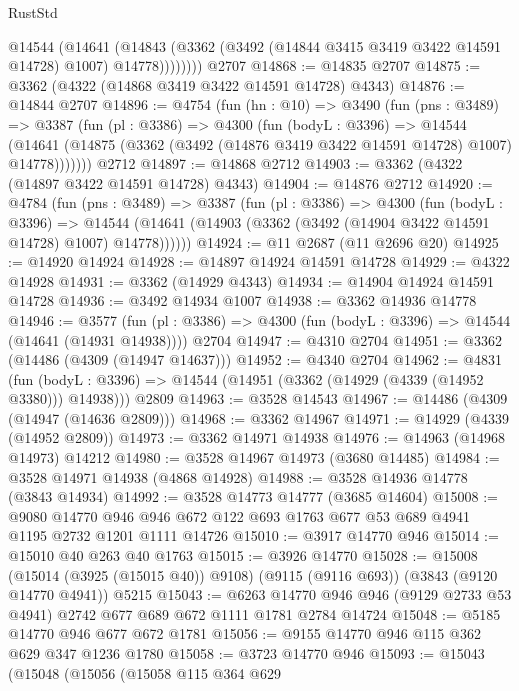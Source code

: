\begin{lexlean}{RustStd}
\begin{coremodule}
            @14544
              (@14641
                (@14843 (@3362 (@3492 (@14844 @3415 @3419 @3422 @14591 @14728) @1007) @14778))))))))
    @2707
@14868 := @14835 @2707
@14875 := @3362 (@4322 (@14868 @3419 @3422 @14591 @14728) @4343)
@14876 := @14844 @2707
@14896 := @4754
    (fun (hn : @10) =>
    @3490
      (fun (pns : @3489) =>
      @3387
        (fun (pl : @3386) =>
        @4300
          (fun (bodyL : @3396) =>
          @14544
            (@14641 (@14875 (@3362 (@3492 (@14876 @3419 @3422 @14591 @14728) @1007) @14778)))))))
    @2712
@14897 := @14868 @2712
@14903 := @3362 (@4322 (@14897 @3422 @14591 @14728) @4343)
@14904 := @14876 @2712
@14920 := @4784
    (fun (pns : @3489) =>
    @3387
      (fun (pl : @3386) =>
      @4300
        (fun (bodyL : @3396) =>
        @14544 (@14641 (@14903 (@3362 (@3492 (@14904 @3422 @14591 @14728) @1007) @14778))))))
@14924 := @11 @2687 (@11 @2696 @20)
@14925 := @14920 @14924
@14928 := @14897 @14924 @14591 @14728
@14929 := @4322 @14928
@14931 := @3362 (@14929 @4343)
@14934 := @14904 @14924 @14591 @14728
@14936 := @3492 @14934 @1007
@14938 := @3362 @14936 @14778
@14946 := @3577
    (fun (pl : @3386) => @4300 (fun (bodyL : @3396) => @14544 (@14641 (@14931 @14938))))
    @2704
@14947 := @4310 @2704
@14951 := @3362 (@14486 (@4309 (@14947 @14637)))
@14952 := @4340 @2704
@14962 := @4831
    (fun (bodyL : @3396) => @14544 (@14951 (@3362 (@14929 (@4339 (@14952 @3380))) @14938)))
    @2809
@14963 := @3528 @14543
@14967 := @14486 (@4309 (@14947 (@14636 @2809)))
@14968 := @3362 @14967
@14971 := @14929 (@4339 (@14952 @2809))
@14973 := @3362 @14971 @14938
@14976 := @14963 (@14968 @14973) @14212
@14980 := @3528 @14967 @14973 (@3680 @14485)
@14984 := @3528 @14971 @14938 (@4868 @14928)
@14988 := @3528 @14936 @14778 (@3843 @14934)
@14992 := @3528 @14773 @14777 (@3685 @14604)
@15008 := @9080
    @14770
    @946
    @946
    @672
    @122
    @693
    @1763
    @677
    @53
    @689
    @4941
    @1195
    @2732
    @1201
    @1111
    @14726
@15010 := @3917 @14770 @946
@15014 := @15010 @40 @263 @40 @1763
@15015 := @3926 @14770
@15028 := @15008
    (@15014 (@3925 (@15015 @40)) @9108)
    (@9115 (@9116 @693))
    (@3843 (@9120 @14770 @4941))
    @5215
@15043 := @6263
    @14770
    @946
    @946
    (@9129 @2733 @53 @4941)
    @2742
    @677
    @689
    @672
    @1111
    @1781
    @2784
    @14724
@15048 := @5185 @14770 @946 @677 @672 @1781
@15056 := @9155 @14770 @946 @115 @362 @629 @347 @1236 @1780
@15058 := @3723 @14770 @946
@15093 := @15043
    (@15048
      (@15056
        (@15058
          @115
          @364
          @629

\end{coremodule}
\end{lexlean}

